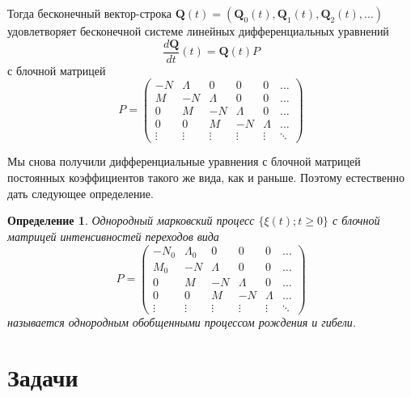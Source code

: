 \documentclass[10pt,oneside,final]{book}
\newcommand{\bQ}{{\boldsymbol Q}}
\newtheorem{definition}{\color{CadetBlue}Определение}
\begin{document}
Тогда бесконечный вектор-строка $\bQ(t)=(\bQ_0(t), \bQ_1(t), \bQ_2(t), \ldots)$
удовлетворяет бесконечной системе линейных дифференциальных уравнений
\[
\dfrac{d\bQ}{dt}(t)=\bQ(t)P
\]
с блочной матрицей
\[
P=
\begin{pmatrix}
  -N & \Lambda & 0 & 0 & 0 &\ldots \\
  M & -N & \Lambda & 0 & 0 & \ldots \\
  0 & M & -N & \Lambda & 0 & \ldots \\
  0 & 0 & M & -N & \Lambda & \ldots \\
  \vdots & \vdots & \vdots & \vdots & \vdots & \ddots
\end{pmatrix}
\]

Мы снова получили дифференциальные уравнения с блочной матрицей постоянных
коэффициентов такого же вида, как и раньше. Поэтому естественно дать следующее
определение.

\begin{definition}
Однородный марковский процесс $\{\xi(t); t\geqslant0\}$ с блочной матрицей
интенсивностей переходов вида
\[
P=
\begin{pmatrix}
  -N_0 & \Lambda_0 & 0 & 0 & 0 &\ldots \\
  M_0 & -N & \Lambda & 0 & 0 & \ldots \\
  0 & M & -N & \Lambda & 0 & \ldots \\
  0 & 0 & M & -N & \Lambda & \ldots \\
  \vdots & \vdots & \vdots & \vdots & \vdots & \ddots
\end{pmatrix}
\]
называется однородным обобщенными процессом рождения и гибели.
\end{definition}

\section{Задачи}
\end{document}
